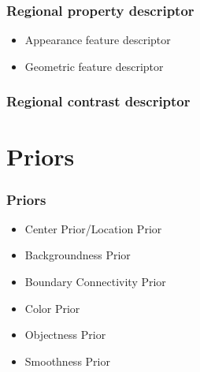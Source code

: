 \documentclass[notheorems,serif,table,compress]{beamer}  %
\begin{document}
\begin{frame}
\frametitle{Regional property descriptor}
\begin{itemize}
\item Appearance feature descriptor
\item Geometric feature descriptor
\end{itemize}
\end{frame}


\begin{frame}
\frametitle{Regional contrast descriptor}

\end{frame}


\section{Priors}

\begin{frame}
\frametitle{Priors}
\begin{itemize}
\item Center Prior/Location Prior
\item Backgroundness Prior
\item Boundary Connectivity Prior
\item Color Prior
\item Objectness Prior
\item Smoothness Prior
\end{itemize}
\end{frame}
\end{document}
